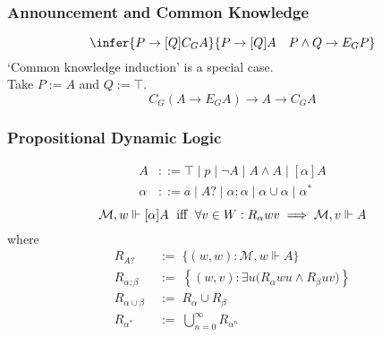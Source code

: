 \documentclass[UTF8,aspectratio=43,11pt,colorlinks,compress,openany]{beamer}%
\begin{document}
\begin{frame}\frametitle{Announcement and Common Knowledge}
\[\infer{P\to[Q]C_GA}{P\to[Q]A\quad P\wedge Q\to E_GP}\]
`Common knowledge induction' is a special case.\\
Take $P:=A$ and $Q:=\top$.
\[C_G(A\to E_GA)\to A\to C_GA\]
\end{frame}

\begin{frame}\frametitle{Propositional Dynamic Logic}
\begin{align*}
 A&::=\top\mid p\mid \neg A\mid A\wedge A\mid [\alpha]A\\
\alpha&::=a\mid A?\mid \alpha;\alpha\mid\alpha\cup\alpha\mid\alpha^*
\end{align*}
\[\mathcal{M},w\Vdash[\alpha]A \mbox{\; iff \;} \forall v\in W: R_\alpha wv\implies\mathcal{M},v\Vdash A\]
where
\begin{align*}
R_{A?}&\;:=\;\{(w,w): \mathcal{M},w\Vdash A\}\\
R_{\alpha;\beta}&\;:=\;\left\{(w,v):\exists u\big(R_{\alpha}wu\wedge R_{\beta}uv\big)\right\}\\
R_{\alpha\cup\beta}&\;:=\;R_{\alpha}\cup R_{\beta}\\
R_{\alpha^*}&\;:=\;\bigcup\limits_{n=0}^\infty R_{\alpha^n}
\end{align*}
\end{frame}
\end{document}
